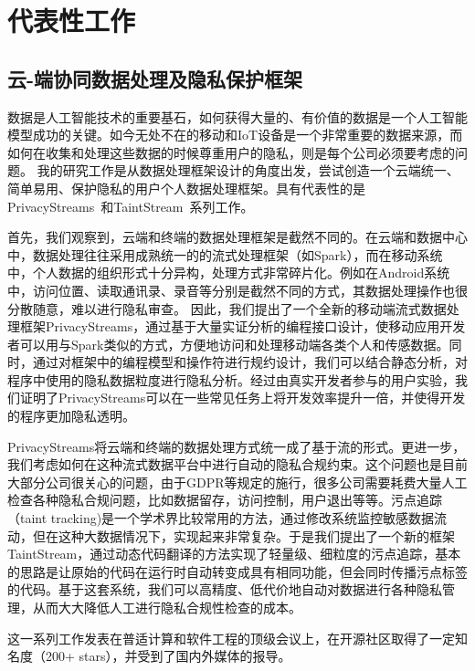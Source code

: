 \documentclass[12pt]{article}
\begin{document}
\section{代表性工作}

\subsection{云-端协同数据处理及隐私保护框架}

数据是人工智能技术的重要基石，如何获得大量的、有价值的数据是一个人工智能模型成功的关键。如今无处不在的移动和IoT设备是一个非常重要的数据来源，而如何在收集和处理这些数据的时候尊重用户的隐私，则是每个公司必须要考虑的问题。
我的研究工作是从数据处理框架设计的角度出发，尝试创造一个云端统一、简单易用、保护隐私的用户个人数据处理框架。具有代表性的是PrivacyStreams~\cite{li2017privacystreams}和TaintStream~\cite{yang2021taintstream}系列工作。

首先，我们观察到，云端和终端的数据处理框架是截然不同的。在云端和数据中心中，数据处理往往采用成熟统一的的流式处理框架（如Spark），而在移动系统中，个人数据的组织形式十分异构，处理方式非常碎片化。例如在Android系统中，访问位置、读取通讯录、录音等分别是截然不同的方式，其数据处理操作也很分散随意，难以进行隐私审查。
因此，我们提出了一个全新的移动端流式数据处理框架PrivacyStreams，通过基于大量实证分析的编程接口设计，使移动应用开发者可以用与Spark类似的方式，方便地访问和处理移动端各类个人和传感数据。同时，通过对框架中的编程模型和操作符进行规约设计，我们可以结合静态分析，对程序中使用的隐私数据粒度进行隐私分析。经过由真实开发者参与的用户实验，我们证明了PrivacyStreams可以在一些常见任务上将开发效率提升一倍，并使得开发的程序更加隐私透明。

PrivacyStreams将云端和终端的数据处理方式统一成了基于流的形式。更进一步，我们考虑如何在这种流式数据平台中进行自动的隐私合规约束。这个问题也是目前大部分公司很关心的问题，由于GDPR等规定的施行，很多公司需要耗费大量人工检查各种隐私合规问题，比如数据留存，访问控制，用户退出等等。污点追踪（taint tracking)是一个学术界比较常用的方法，通过修改系统监控敏感数据流动，但在这种大数据情况下，实现起来非常复杂。于是我们提出了一个新的框架TaintStream，通过动态代码翻译的方法实现了轻量级、细粒度的污点追踪，基本的思路是让原始的代码在运行时自动转变成具有相同功能，但会同时传播污点标签的代码。基于这套系统，我们可以高精度、低代价地自动对数据进行各种隐私管理，从而大大降低人工进行隐私合规性检查的成本。

这一系列工作发表在普适计算和软件工程的顶级会议上，在开源社区取得了一定知名度（200+ stars）\cite{privacystreams:code}，并受到了国内外媒体的报导。
\end{document}
